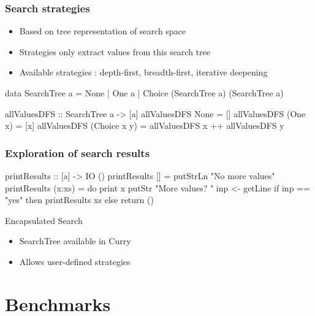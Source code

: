 \documentclass[
,hyperref={pdfpagelabels=false}
]{beamer}
\begin{document}
\begin{frame}[fragile]%
\frametitle{Search strategies}

\begin{itemize}
  \item Based on tree representation of search space
  \item Strategies only extract values from this search tree
  \item Available strategies : depth-first, breadth-first, iterative deepening
\end{itemize}

\begin{haskell}[SearchTree]
data SearchTree a
  = None
  | One a
  | Choice (SearchTree a)
           (SearchTree a)
\end{haskell}

\begin{haskell}
allValuesDFS :: SearchTree a -> [a]
allValuesDFS None         = []
allValuesDFS (One      x) = [x]
allValuesDFS (Choice x y) = allValuesDFS x ++ allValuesDFS y
\end{haskell}

\end{frame}

\begin{frame}[fragile]%
\frametitle{Exploration of search results}
\begin{haskell}
printResults :: [a] -> IO ()
printResults []     = putStrLn "No more values"
printResults (x:xs) = do print x
                         putStr "More values? "
                         inp <- getLine
                         if inp == "yes" then printResults xs
                                         else return ()
\end{haskell}

\begin{curryblock}{Encapsulated Search}
\begin{itemize}
\item SearchTree available in Curry
\item Allows user-defined strategies
\end{itemize}
\end{curryblock}
\end{frame}

\section{Benchmarks}
\end{document}
